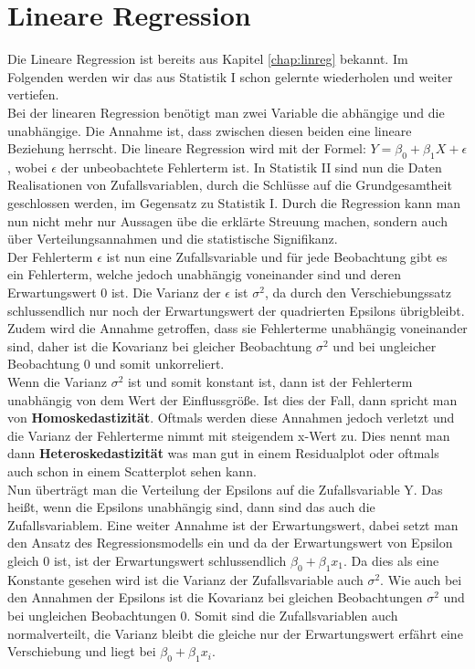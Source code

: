 \documentclass[a4paper]{article}
\begin{document}
\section{Lineare Regression}
Die Lineare Regression ist bereits aus Kapitel \ref{chap:linreg} bekannt. Im Folgenden werden wir das aus Statistik I schon gelernte wiederholen und weiter vertiefen.\\
Bei der linearen Regression benötigt man zwei Variable die abhängige und die unabhängige. Die Annahme ist, dass zwischen diesen beiden eine lineare Beziehung herrscht. Die lineare Regression wird mit der Formel: $Y=\beta_0+\beta_1X+\epsilon$, wobei $\epsilon$ der unbeobachtete Fehlerterm ist. In Statistik II sind nun die Daten Realisationen von Zufallsvariablen, durch die Schlüsse auf die Grundgesamtheit geschlossen werden, im Gegensatz zu Statistik I. Durch die Regression kann man nun nicht mehr nur Aussagen übe die erklärte Streuung machen, sondern auch über Verteilungsannahmen und die statistische Signifikanz. \\
Der Fehlerterm $\epsilon$ ist nun eine Zufallsvariable und für jede Beobachtung gibt es ein Fehlerterm, welche jedoch unabhängig voneinander sind und deren Erwartungswert 0 ist. Die Varianz der $\epsilon$ ist $\sigma^2$, da durch den Verschiebungssatz schlussendlich nur noch der Erwartungswert der quadrierten Epsilons übrigbleibt. Zudem wird die Annahme getroffen, dass sie Fehlerterme unabhängig voneinander sind, daher ist die Kovarianz bei gleicher Beobachtung $\sigma
^2$ und bei ungleicher Beobachtung 0 und somit unkorreliert.\\
Wenn die Varianz $\sigma^2$ ist und somit konstant ist, dann ist der Fehlerterm unabhängig von dem Wert der Einflussgröße. Ist dies der Fall, dann spricht man von \textbf{Homoskedastizität}. Oftmals werden diese Annahmen jedoch verletzt und die Varianz der Fehlerterme nimmt mit steigendem x-Wert zu. Dies nennt man dann \textbf{Heteroskedastizität} was man gut in einem Residualplot oder oftmals auch schon in einem Scatterplot sehen kann.\\
Nun überträgt man die Verteilung der Epsilons auf die Zufallsvariable Y. Das heißt, wenn die Epsilons unabhängig sind, dann sind das auch die Zufallsvariablem. Eine weiter Annahme ist der Erwartungswert, dabei setzt man den Ansatz des Regressionsmodells ein und da der Erwartungswert von Epsilon gleich 0 ist, ist der Erwartungswert schlussendlich $\beta_0+\beta_1x_1$. Da dies als eine Konstante gesehen wird ist die Varianz der Zufallsvariable auch $\sigma
^2$. Wie auch bei den Annahmen der Epsilons ist die Kovarianz bei gleichen Beobachtungen $\sigma^2$ und bei ungleichen Beobachtungen 0. Somit sind die Zufallsvariablen auch normalverteilt, die Varianz bleibt die gleiche nur der Erwartungswert erfährt eine Verschiebung und liegt bei $\beta_0+\beta_1x_i$.
\end{document}
